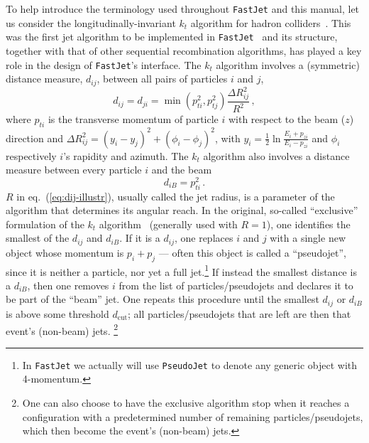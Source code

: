 \documentclass[12pt,a4]{article}
\newcommand{\fastjet}{\texttt{FastJet}\xspace}
\begin{document}
To help introduce the terminology used throughout \fastjet and this
manual, let us consider the longitudinally-invariant $k_t$ algorithm
for hadron colliders~\cite{ktexcl,ktincl}.
%
This was the first jet algorithm to be implemented in
\fastjet~\cite{fastjet} and its 
structure, together with that of other sequential recombination
algorithms, has played a key role in the design of \fastjet's interface.
%
The $k_t$ algorithm involves a (symmetric) distance measure, $d_{ij}$,
between all pairs of particles $i$ and $j$,
\begin{equation}
  \label{eq:dij-illustr}
  d_{ij} = d_{ji} = \min(p_{ti}^2, p_{tj}^2) \frac{\Delta R_{ij}^2}{R^2}\,,
\end{equation}
where $p_{ti}$ is the transverse momentum of particle $i$ with respect
to the beam ($z$) direction and $\Delta R_{ij}^2 = (y_i - y_j)^2 +
(\phi_i - \phi_j)^2$, with $y_i = \frac12 \ln \frac{E_i + p_{zi}}{E_i
  - p_{zi}}$ and $\phi_i$ respectively $i$'s rapidity and azimuth.
%
The $k_t$ algorithm also involves a distance measure between every
particle $i$ and the beam
\begin{equation}
  \label{eq:diB-illustr}
  d_{iB} = p_{ti}^2\,.
\end{equation}
%
$R$ in eq.~(\ref{eq:dij-illustr}), usually called the jet radius, is a
parameter of the algorithm that determines its angular reach.
%
In the original, so-called ``exclusive'' formulation of the $k_t$
algorithm~\cite{ktexcl} (generally used with $R=1$), one identifies
the smallest of the $d_{ij}$ and $d_{iB}$. 
%
If it is a $d_{ij}$, one replaces $i$ and $j$ with a single new object
whose momentum is $p_i + p_j$ --- often this object is called a
``pseudojet'', since it is neither a particle, nor yet a full
jet.\footnote{In \fastjet we actually will use \texttt{PseudoJet} to denote any
  generic object with 4-momentum.}
%
If instead the smallest distance is a $d_{iB}$, then one removes $i$
from the list of particles/pseudojets and declares it to be part of
the ``beam'' jet.
%
One repeats this procedure until the smallest $d_{ij}$ or $d_{iB}$ is
above some threshold $d_{\text{cut}}$; all particles/pseudojets that
are left are then that event's (non-beam) jets.%
%
\footnote{One can also choose to have the exclusive algorithm stop
  when it reaches a configuration with a predetermined number of
  remaining particles/pseudojets, which then become the event's
  (non-beam) jets.}
\end{document}
